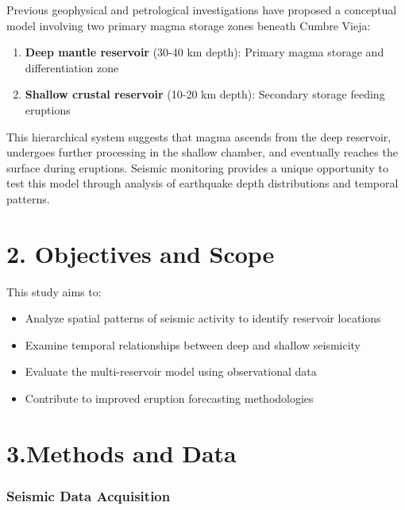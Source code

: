 \documentclass[
  letterpaper,
]{article}
\providecommand{\tightlist}{%
  \setlength{\itemsep}{0pt}\setlength{\parskip}{0pt}}
\begin{document}
Previous geophysical and petrological investigations have proposed a
conceptual model involving two primary magma storage zones beneath
Cumbre Vieja:

\begin{enumerate}
\def\labelenumi{\arabic{enumi}.}
\tightlist
\item
  \textbf{Deep mantle reservoir} (30-40 km depth): Primary magma storage
  and differentiation zone
\item
  \textbf{Shallow crustal reservoir} (10-20 km depth): Secondary storage
  feeding eruptions
\end{enumerate}

This hierarchical system suggests that magma ascends from the deep
reservoir, undergoes further processing in the shallow chamber, and
eventually reaches the surface during eruptions. Seismic monitoring
provides a unique opportunity to test this model through analysis of
earthquake depth distributions and temporal patterns.


\chapter{2. Objectives and Scope}\label{objectives-and-scope}

This study aims to:

\begin{itemize}
\tightlist
\item
  Analyze spatial patterns of seismic activity to identify reservoir
  locations
\item
  Examine temporal relationships between deep and shallow seismicity
\item
  Evaluate the multi-reservoir model using observational data
\item
  Contribute to improved eruption forecasting methodologies
\end{itemize}


\chapter{3.Methods and Data}\label{methods-and-data}

\subsection{Seismic Data Acquisition}\label{seismic-data-acquisition}
\end{document}
